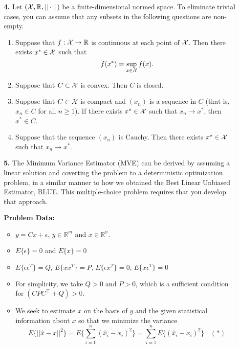 \documentclass[letterpaper]{article}
\newcommand{\real}{\mathbb R}  %
\begin{document}
\begin{enumerate}
\vspace*{5cm}


\item[{\bf 4.}]  Let  $({\cal X}, \real, ||\cdot||)$ be a finite-dimensional normed space. To eliminate trivial cases, you can assume that any subsets in the following questions are non-empty.
\begin{enumerate}
\setlength{\itemsep}{.15in}
\renewcommand{\labelenumi}{(\alph{enumi})}
\setlength{\itemsep}{.1in}


\item Suppose that $f:{\cal X} \to \real$ is continuous at each point of ${\cal X} $. Then there exists $x^* \in {\cal X}$ such that $$f(x^*) = \sup_{x \in {\cal X} }f(x).$$


\item Suppose that $C\subset {\cal X}$ is convex. Then $C$ is closed.

\item Suppose that $C\subset {\cal X}$ is compact and $(x_n)$ is a sequence in $C$ (that is, $x_n \in C$ for all $n \ge 1$). If there exists $x^*\in {\cal X}$ such that  $x_n \to x^*$, then $x^*\in C$.

\item Suppose that the sequence $(x_n)$ is Cauchy. Then there exists $x^* \in {\cal X}$ such that $x_n \to x^*$.




\end{enumerate}


\newpage


\item[{\bf 5.}]  The Minimum Variance Estimator (MVE) can be derived by assuming a linear solution and coverting the problem to a deterministic optimization problem, in a similar manner to how we obtained the Best Linear Unbiased Estimator, BLUE. This multiple-choice problem requires that you develop that approach.

  \noindent  \textbf{Problem Data:}
  \begin{itemize}
  \item $y = Cx + \epsilon$, $y \in \real^m$ and $x \in \real^n$.
  \item $E\{\epsilon \} = 0$ and $E\{ x \}=0$
  \item $E\{ \epsilon \epsilon^T \} = Q $,  $E\{ x x^T \} = P $,  $E\{ \epsilon x^T \} = 0 $, $E\{ x \epsilon^T \} = 0 $
  \item For simplicity, we take $Q >0$ and $P>0$, which is a sufficient condition for $(C P C^\top + Q)>0$.
  \item We seek to estimate $x$ on the basis of $y$ and the given statistical information about $x$ so that we minimize the variance
      $$E\{ ||\hat{x} - x||^2 \} = E\{ \sum_{i=1}^n \left( \hat{x}_i - x_i \right)^2 \} =  \sum_{i=1}^nE\{ \left( \hat{x}_i - x_i \right)^2 \} ~~~~(*) $$


\end{itemize}
\end{enumerate}
\end{document}
